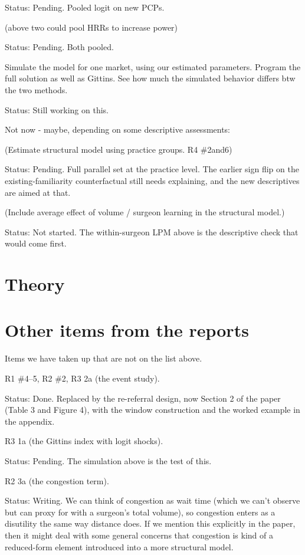 \documentclass[11pt]{article}
\newcommand{\status}[1]{\par\noindent Status: #1\par\medskip\noindent{\color{gray!40}\hrulefill}\par\medskip}
\begin{document}
\status{Pending. Pooled logit on new PCPs.}

(above two could pool HRRs to increase power)

\status{Pending. Both pooled.}

Simulate the model for one market, using our estimated parameters. Program the full solution as well as Gittins. See how much the simulated behavior differs btw the two methods.

\status{Still working on this.}

Not now - maybe, depending on some descriptive assessments:

(Estimate structural model using practice groups. R4 \#2and6)

\status{Pending. Full parallel set at the practice level. The earlier sign flip on the existing-familiarity counterfactual still needs explaining, and the new descriptives are aimed at that.}

(Include average effect of volume / surgeon learning in the structural model.)

\status{Not started. The within-surgeon LPM above is the descriptive check that would come first.}

\section{Theory}

\section{Other items from the reports}

Items we have taken up that are not on the list above.

R1 \#4--5, R2 \#2, R3 2a (the event study). \status{Done. Replaced by the re-referral design, now Section 2 of the paper (Table 3 and Figure 4), with the window construction and the worked example in the appendix.}

R3 1a (the Gittins index with logit shocks). \status{Pending. The simulation above is the test of this.}

R2 3a (the congestion term). \status{Writing. We can think of congestion as wait time (which we can't observe but can proxy for with a surgeon's total volume), so congestion enters as a disutility the same way distance does. If we mention this explicitly in the paper, then it might deal with some general concerns that congestion is kind of a reduced-form element introduced into a more structural model.}
\end{document}
